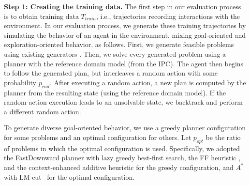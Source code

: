 \documentclass[letterpaper]{article} %
\newcommand{\T}{T}
\newcommand{\Ttrain}{\T_{\textit{train}}}
\newcommand{\miniparagraph}[1]{\textbf{#1.}}
\newif\ifaddcomments
\newcommand{\roni}[1]{\ifaddcomments{\textcolor{red}{[Roni: #1]}}\fi}
\newcommand{\leo}[1]{\ifaddcomments{\textcolor{pink}{[Leonardo: #1]}}\fi}
\begin{document}
%
\miniparagraph{Step 1: Creating the training data} 
The first step in our evaluation process is to obtain training data $\Ttrain$, i.e., trajectories recording interactions with the environment. 
In our evaluation process, we generate these training trajectories by simulating the behavior of an agent in the environment, mixing goal-oriented and exploration-oriented behavior, as follows. 
First, we generate feasible problems using existing generators \citep{seipp-et-al-zenodo2022}. 
Then, we solve every generated problem using a planner with the reference domain model (from the IPC). 
The agent then begins to follow the generated plan, but interleaves a random action with some probability $p_{rnd}$.  
After executing a random action, a new plan is computed by the planner from the resulting state (using the reference domain model). If the random action execution leads to an unsolvable state, we backtrack and perform a different random action. 

To generate diverse goal-oriented behavior, we use a greedy planner configuration for some problems and an optimal configuration for others. 
Let $p_{opt}$ be the ratio of problems in which the optimal configuration is used. 
Specifically, we adopted the FastDownward planner \citep{helmert2006fast}
with lazy greedy best-first search, the
FF heuristic \citep{hoffmann2001ff}, and the context-enhanced additive heuristic \citep{helmert2008unifying} for the greedy configuration, and $A^*$ with LM cut~\cite{karpas2009cost} for the optimal configuration. 
\end{document}
